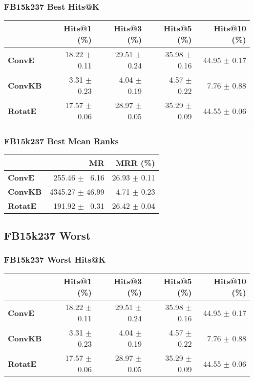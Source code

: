 \documentclass{article}
\begin{document}
\subsubsection{FB15k237 Best Hits@K}
    \begin{center}
    \begin{tabular}{lrrrr}
\toprule
{} &   Hits@1 (\%) &   Hits@3 (\%) &   Hits@5 (\%) &  Hits@10 (\%) \\
\midrule
\textbf{ConvE } &  18.22 $\pm$ 0.11 &  29.51 $\pm$ 0.24 &  35.98 $\pm$ 0.16 &  44.95 $\pm$ 0.17 \\
\textbf{ConvKB} &  $\phantom{5}$3.31 $\pm$ 0.23 &  $\phantom{5}$4.04 $\pm$ 0.19 &  $\phantom{5}$4.57 $\pm$ 0.22 &  $\phantom{5}$7.76 $\pm$ 0.88 \\
\textbf{RotatE} &  17.57 $\pm$ 0.06 &  28.97 $\pm$ 0.05 &  35.29 $\pm$ 0.09 &  44.55 $\pm$ 0.06 \\
\bottomrule
\end{tabular}

    \end{center}
\subsubsection{FB15k237 Best Mean Ranks}
    \begin{center}
    \begin{tabular}{lrr}
\toprule
{} &               MR &      MRR (\%) \\
\midrule
\textbf{ConvE } &  $\phantom{5}$255.46 $\pm$ $\phantom{5}$6.16 &  26.93 $\pm$ 0.11 \\
\textbf{ConvKB} &  4345.27 $\pm$ 46.99 &  $\phantom{5}$4.71 $\pm$ 0.23 \\
\textbf{RotatE} &  $\phantom{5}$191.92 $\pm$ $\phantom{5}$0.31 &  26.42 $\pm$ 0.04 \\
\bottomrule
\end{tabular}

    \end{center}
\subsection{FB15k237 Worst}
\subsubsection{FB15k237 Worst Hits@K}
    \begin{center}
    \begin{tabular}{lrrrr}
\toprule
{} &   Hits@1 (\%) &   Hits@3 (\%) &   Hits@5 (\%) &  Hits@10 (\%) \\
\midrule
\textbf{ConvE } &  18.22 $\pm$ 0.11 &  29.51 $\pm$ 0.24 &  35.98 $\pm$ 0.16 &  44.95 $\pm$ 0.17 \\
\textbf{ConvKB} &  $\phantom{5}$3.31 $\pm$ 0.23 &  $\phantom{5}$4.04 $\pm$ 0.19 &  $\phantom{5}$4.57 $\pm$ 0.22 &  $\phantom{5}$7.76 $\pm$ 0.88 \\
\textbf{RotatE} &  17.57 $\pm$ 0.06 &  28.97 $\pm$ 0.05 &  35.29 $\pm$ 0.09 &  44.55 $\pm$ 0.06 \\
\bottomrule
\end{tabular}

    \end{center}
\end{document}

